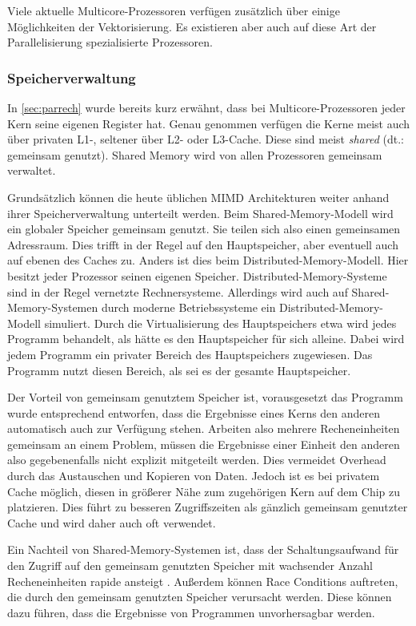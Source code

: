       Viele aktuelle Multicore-Prozessoren verfügen zusätzlich über einige Möglichkeiten der Vektorisierung. Es existieren aber auch auf diese Art der Parallelisierung spezialisierte Prozessoren.
      \citep{architect}
      
      \subsubsection{Speicherverwaltung}
      \label{sec:speicher}
	In \autoref{sec:parrech} wurde bereits kurz erwähnt, dass bei Multicore-Prozessoren jeder Kern seine eigenen Register hat. Genau genommen verfügen die Kerne meist auch über privaten L1-,
	seltener über L2- oder L3-Cache. Diese sind meist \textit{shared} (dt.: gemeinsam genutzt). Shared Memory wird von allen Prozessoren gemeinsam verwaltet.
	
	Grundsätzlich können die heute üblichen MIMD Architekturen weiter anhand ihrer Speicherverwaltung unterteilt werden. Beim Shared-Memory-Modell wird ein globaler
	Speicher gemeinsam genutzt. Sie teilen sich also einen gemeinsamen Adressraum. Dies trifft in der Regel auf den Hauptspeicher, aber eventuell auch auf ebenen des Caches zu.
	Anders ist dies beim Distributed-Memory-Modell. Hier besitzt jeder Prozessor seinen eigenen Speicher. Distributed-Memory-Systeme sind in der Regel vernetzte Rechnersysteme. Allerdings wird
	auch auf Shared-Memory-Systemen durch moderne Betriebssysteme ein Distributed-Memory-Modell simuliert. Durch die Virtualisierung des Hauptspeichers etwa wird jedes Programm behandelt,
	als hätte es den Hauptspeicher für sich alleine. Dabei wird jedem Programm ein privater Bereich des Hauptspeichers zugewiesen. Das Programm nutzt diesen Bereich, als sei es der gesamte
	Hauptspeicher. \citep{korbler}
	
	Der Vorteil von gemeinsam genutztem Speicher ist, vorausgesetzt das Programm wurde entsprechend entworfen, dass die Ergebnisse eines Kerns den anderen automatisch auch zur Verfügung stehen. 
	Arbeiten  also mehrere Recheneinheiten gemeinsam an einem Problem, müssen die Ergebnisse einer Einheit den anderen also gegebenenfalls nicht explizit mitgeteilt werden. Dies vermeidet Overhead
	durch das Austauschen und Kopieren von Daten.
	Jedoch ist es bei privatem Cache möglich, diesen in größerer Nähe zum zugehörigen Kern auf dem Chip zu platzieren. Dies führt zu besseren Zugriffszeiten als gänzlich gemeinsam genutzter 
	Cache und wird daher auch oft verwendet. 
	
	Ein Nachteil von Shared-Memory-Systemen ist, dass der Schaltungsaufwand für den Zugriff auf den gemeinsam genutzten Speicher mit wachsender Anzahl Recheneinheiten rapide ansteigt
	\citep{hpcskript}. Außerdem können Race Conditions auftreten, die durch den gemeinsam genutzten Speicher verursacht werden. Diese können dazu führen, dass die Ergebnisse von Programmen
	unvorhersagbar werden.
	
